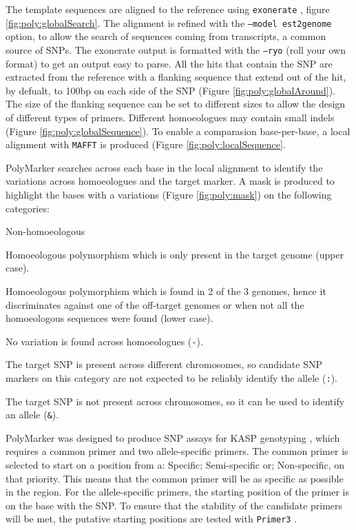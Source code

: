 The template sequences are aligned to the reference using \texttt{exonerate} \citep{Slater2005}, figure \ref{fig:poly:globalSearch}. 
The alignment is refined with the \texttt{--model est2genome} option, to allow the search of sequences coming from transcripts, a common source of SNPs\citep{Allen2011}. 
The exonerate output is formatted with the \texttt{--ryo} (roll your own format) to get an output easy to parse. 
All the hits that contain the SNP are extracted from the reference with a flanking sequence that extend out of the hit, by defualt, to 100bp on each side of the SNP (Figure \ref{fig:poly:globalAround}).
The size of the flanking sequence can be set to different sizes to allow the design of different types of primers. 
Different homoeologues may contain small indels (Figure \ref{fig:poly:globalSequence}). 
To enable a comparasion base-per-base, a local alignment with \texttt{MAFFT} \citep{Katoh2013} is produced (Figure \ref{fig:poly:localSequence}. 

PolyMarker searches across each base in the local alignment to identify the variations across homoeologues and the target marker.
A mask is produced to highlight the bases with a variations (Figure \ref{fig:poly:mask}) on the following categories:
\begin{labeling}{Non-homoeologous}
\item [Specific] Homoeologous polymorphism which is only present in the target genome (upper case).
\item [Semi-specific] Homoeologous polymorphism which is found in 2 of the 3 genomes, hence it discriminates against one of the off-target genomes or when not all the homoeologous sequences were found (lower case).
\item [Non-specific] No variation is found across homoeologues (\texttt{-}).
\item [Homoeologous] The target SNP is present across different chromosomes, so candidate SNP markers on this category are not expected to be reliably identify the allele (\texttt{:}).
\item [Non-homoeologous] The target SNP is not present across chromosomes, so it can be used to identify an allele (\texttt{\&}).
\end{labeling} 

PolyMarker was designed to produce SNP assays for KASP genotyping \citep{LGC}, which requires a common primer and two allele-specific primers. 
The common primer is selected to start on a position from a: Specific; Semi-specific or; Non-specific, on that priority. 
This means that the common primer will be as specific as possible in the region. 
For the allele-specific primers, the starting position of the primer is on the base with the SNP. 
To ensure that the stability of the candidate primers will be met, the putative starting positions are tested with \texttt{Primer3} \citep{Rozen}. 

